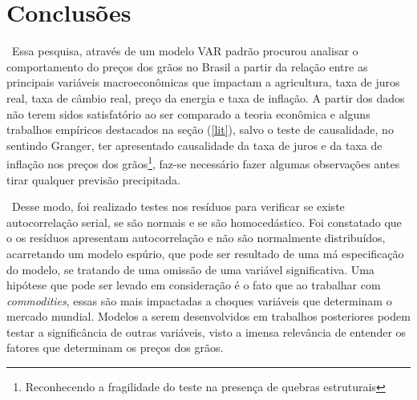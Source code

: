 \documentclass[a4paper,12pt,oneside,titlepage]{article}
\begin{document}
\section{Conclusões}
\label{conc}

\ Essa pesquisa, através de um modelo VAR padrão procurou analisar o comportamento do preços dos grãos no Brasil a partir da relação entre as principais variáveis macroeconômicas que impactam a agricultura, taxa de juros real, taxa de câmbio real, preço da energia e taxa de inflação. A partir dos dados não terem sidos satisfatório ao ser comparado a teoria econômica e alguns trabalhos empíricos destacados na seção (\ref{lit}), salvo o teste de causalidade, no sentindo Granger, ter apresentado causalidade da taxa de juros e da taxa de inflação nos preços dos grãos\footnote{Reconhecendo a fragilidade do teste na presença de quebras estruturais}, faz-se necessário fazer algumas observações antes tirar qualquer previsão precipitada. 

\ Desse modo, foi realizado testes nos resíduos para verificar se existe autocorrelação serial, se são normais e se são homocedástico. Foi constatado que o os resíduos apresentam autocorrelação e não são normalmente distribuídos, acarretando um modelo espúrio,  que pode ser resultado de uma má especificação do modelo, se tratando de uma omissão de uma variável significativa. Uma hipótese que pode ser levado em consideração é o fato que ao trabalhar com \textit{commodities}, essas são mais impactadas a choques variáveis que determinam o mercado mundial. Modelos a serem desenvolvidos em trabalhos posteriores podem testar a significância de outras variáveis, visto a imensa relevância de entender os fatores que determinam os preços dos grãos.   
\end{document}
